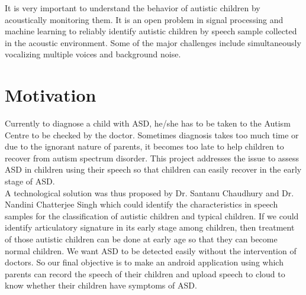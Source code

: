\documentclass[11pt]{report}
\begin{document}
It is very important to understand the behavior of autistic children by acoustically monitoring them. It is an open problem in signal processing and machine learning to reliably identify autistic children by speech sample collected in the acoustic environment. Some of the major challenges include simultaneously vocalizing multiple voices and background noise.\\

\section{Motivation}
Currently to diagnose a child with ASD, he/she has to be taken to the Autism Centre to be checked by the doctor. Sometimes diagnosis takes too much time or due to the ignorant nature of parents, it becomes too late to help children to recover from autism spectrum disorder. This project addresses the issue to assess ASD in children using their speech so that children can easily recover in the early stage of ASD.\\  
A technological solution was thus proposed by Dr. Santanu Chaudhury and Dr. Nandini Chatterjee Singh  which could identify the characteristics in speech samples for the classification of autistic children and typical children. If we could identify articulatory signature \cite{arti} in its early stage among children, then treatment of those autistic children can be done at early age so that they can become normal children. We want ASD to be detected easily without the intervention of doctors. So our final objective is to make an android application using which parents can record the speech of their children and upload speech to cloud to know whether their children have symptoms of ASD.
\end{document}
